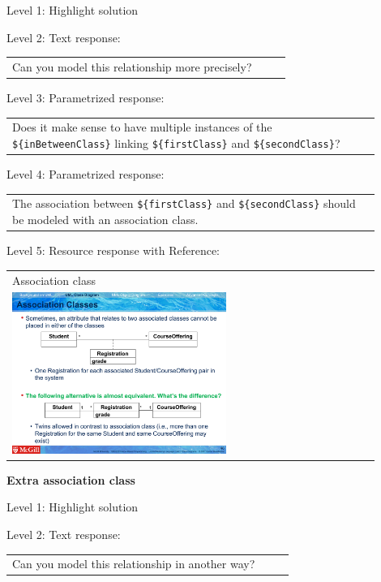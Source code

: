 \noindent Level 1: Highlight solution \medskip

\noindent Level 2: Text response: \medskip

\begin{tabular}{|p{0.9\linewidth}}
Can you model this relationship more precisely?
\end{tabular} \medskip

\noindent Level 3: Parametrized response: \medskip

\begin{tabular}{|p{0.9\linewidth}}
Does it make sense to have multiple instances of the \verb|${inBetweenClass}| linking \verb|${firstClass}| and \verb|${secondClass}|?
\end{tabular} \medskip

\noindent Level 4: Parametrized response: \medskip

\begin{tabular}{|p{0.9\linewidth}}
The association between \verb|${firstClass}| and \verb|${secondClass}| should be modeled with an association class.
\end{tabular} \medskip

\noindent Level 5: Resource response with Reference: \medskip

\begin{tabular}{|p{0.9\linewidth}}
Association class

\\
\includegraphics[width=0.6\textwidth]{images/association_class.png}
\end{tabular} \medskip


\noindent \textbf{Extra association class} \medskip

\noindent Level 1: Highlight solution \medskip

\noindent Level 2: Text response: \medskip

\begin{tabular}{|p{0.9\linewidth}}
Can you model this relationship in another way?
\end{tabular} \medskip


